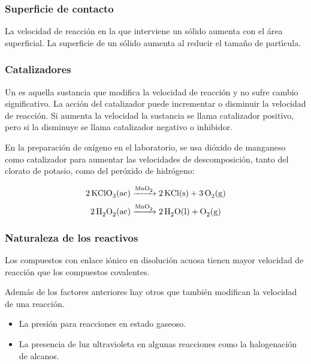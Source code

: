 \subsubsection{Superficie de contacto}
La velocidad de reacci\'on  en la que interviene un s\'olido aumenta con el \'area superficial. La superficie de un s\'olido aumenta al reducir el tama\~no de part\'{\i}cula.
\subsubsection{Catalizadores}
Un  es aquella sustancia que modifica la
velocidad de reacci\'on y no sufre cambio significativo. La acci\'on del catalizador puede incrementar o disminuir la velocidad de reacci\'on. Si aumenta la velocidad la sustancia se llama catalizador positivo, pero si la disminuye se llama catalizador negativo o inhibidor.
 
 
\begin{example}
En la preparaci\'on de oxígeno en el laboratorio, se usa di\'oxido de manganeso como catalizador para aumentar las velocidades de descomposición, tanto del clorato de potasio, como del per\'oxido de hidr\'ogeno:

$$ \ce{2KClO3 (ac) ->[\ce{MnO2}]  2KCl (s)  + 3O2 (g)} $$
$$\ce{2H2O2 (ac) ->[\ce{MnO2}]  2H2O (l) + O2 (g)} $$
\end{example}

\subsubsection{Naturaleza de los reactivos}

Los compuestos con enlace i\'onico en disoluci\'on acuosa tienen mayor velocidad de reacci\'on que los compuestos covalentes.

Adem\'as de los factores anteriores hay otros que tambi\'en modifican la velocidad de una reacci\'on.

\begin{itemize}
\item La presi\'on para reacciones en estado  gaseoso.
\item La presencia de luz ultravioleta en algunas reacciones como la halogenaci\'on de alcanos. 
\end{itemize}

